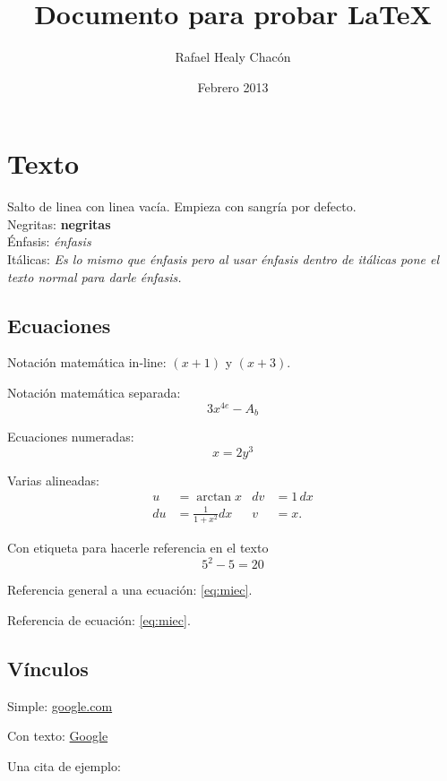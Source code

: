 \documentclass[12pt, a4paper,twoside]{article} %
\title{Documento para probar \LaTeX}
\author{Rafael Healy Chacón}
\date{Febrero 2013}
\begin{document}
\maketitle
\clearpage

\tableofcontents
{}
\listoffigures
\listoftables

\clearpage
\section{Texto}
Salto de linea con linea vacía. Empieza con sangría por defecto.\\
Negritas: \textbf{negritas}\\
Énfasis: \emph{énfasis}\\
Itálicas: \textit{Es lo mismo que énfasis pero al usar énfasis \emph{dentro} de itálicas pone el texto normal para darle énfasis.}

\subsection{Ecuaciones}
Notación matemática in-line: $(x+1)$ y $(x+3)$.

Notación matemática separada: $$3x^{4e} - A_b$$ 

Ecuaciones numeradas: 
\begin{equation} 
x=2y^3 
\end{equation}

Varias alineadas:
\begin{align}
u &= \arctan x & dv &= 1 \, dx
\\ du &= \frac{1}{1 + x^2} dx & v &= x.
\end{align}

Con etiqueta para hacerle referencia en el texto
\begin{equation} \label{eq:miec}
5^2 - 5 = 20
\end{equation}

Referencia general a una ecuación: \ref{eq:miec}. 

Referencia de ecuación: \eqref{eq:miec}.

\subsection{Vínculos}
Simple: \url{google.com}

Con texto: \href{google.com}{Google}

Una cita de ejemplo: \cite{texbook}
\end{document}
